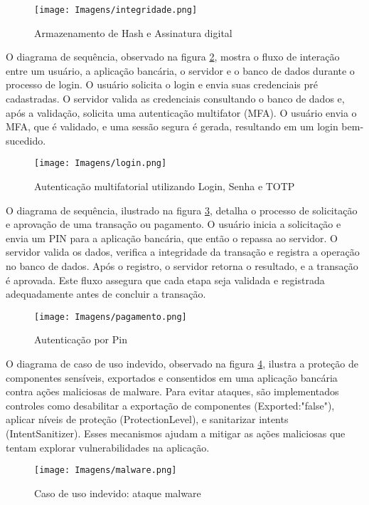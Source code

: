     \begin{figure}[H]
    \centering 
    \texttt{[image: Imagens/integridade.png]} 
    \caption{Armazenamento de Hash e Assinatura digital}
    \label{transacao}
    \end{figure}    

    O diagrama de sequência, observado na figura \ref{totp}, mostra o fluxo de interação entre um usuário, a aplicação bancária, o servidor e o banco de dados durante o processo de login. O usuário solicita o login e envia suas credenciais pré cadastradas. O servidor valida as credenciais consultando o banco de dados e, após a validação, solicita uma autenticação multifator (MFA). O usuário envia o MFA, que é validado, e uma sessão segura é gerada, resultando em um login bem-sucedido. 
    
    \begin{figure}[H]
    \centering 
    \texttt{[image: Imagens/login.png]} 
    \caption{Autenticação multifatorial utilizando Login, Senha e TOTP}
    \label{totp}
    \end{figure}

    O diagrama de sequência, ilustrado na figura \ref{pin}, detalha o processo de solicitação e aprovação de uma transação ou pagamento. O usuário inicia a solicitação e envia um PIN para a aplicação bancária, que então o repassa ao servidor. O servidor valida os dados, verifica a integridade da transação e registra a operação no banco de dados. Após o registro, o servidor retorna o resultado, e a transação é aprovada. Este fluxo assegura que cada etapa seja validada e registrada adequadamente antes de concluir a transação.

    \begin{figure}[H]
    \centering 
    \texttt{[image: Imagens/pagamento.png]} 
    \caption{Autenticação por Pin}
    \label{pin}
    \end{figure}

    O diagrama de caso de uso indevido, observado na figura \ref{malware}, ilustra a proteção de componentes sensíveis, exportados e consentidos em uma aplicação bancária contra ações maliciosas de malware. Para evitar ataques, são implementados controles como desabilitar a exportação de componentes (Exported:"false"), aplicar níveis de proteção (ProtectionLevel), e sanitarizar intents (IntentSanitizer). Esses mecanismos ajudam a mitigar as ações maliciosas que tentam explorar vulnerabilidades na aplicação.

    \begin{figure}[H]
    \centering 
    \texttt{[image: Imagens/malware.png]} 
    \caption{Caso de uso indevido: ataque malware}
    \label{malware}
    \end{figure}
    